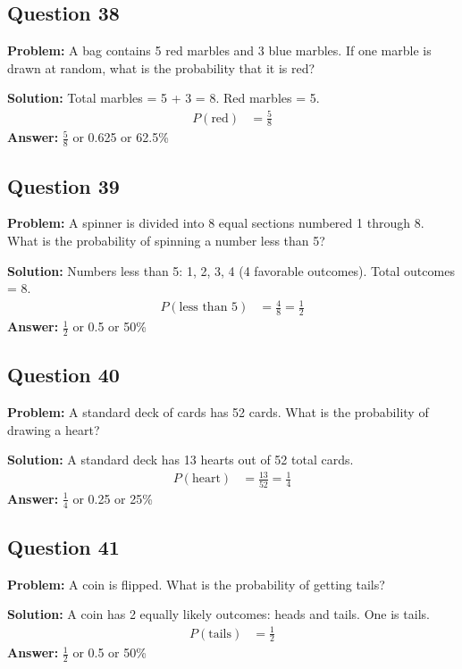 \documentclass[12pt]{article}
\begin{document}
\subsection*{Question 38}
\textbf{Problem:} A bag contains 5 red marbles and 3 blue marbles. If one marble is drawn at random, what is the probability that it is red?

\textbf{Solution:} Total marbles = 5 + 3 = 8. Red marbles = 5.
\begin{align*}
P(\text{red}) &= \frac{5}{8}
\end{align*}
\textbf{Answer:} $\frac{5}{8}$ or 0.625 or 62.5\%

\subsection*{Question 39}
\textbf{Problem:} A spinner is divided into 8 equal sections numbered 1 through 8. What is the probability of spinning a number less than 5?

\textbf{Solution:} Numbers less than 5: 1, 2, 3, 4 (4 favorable outcomes). Total outcomes = 8.
\begin{align*}
P(\text{less than 5}) &= \frac{4}{8} = \frac{1}{2}
\end{align*}
\textbf{Answer:} $\frac{1}{2}$ or 0.5 or 50\%

\subsection*{Question 40}
\textbf{Problem:} A standard deck of cards has 52 cards. What is the probability of drawing a heart?

\textbf{Solution:} A standard deck has 13 hearts out of 52 total cards.
\begin{align*}
P(\text{heart}) &= \frac{13}{52} = \frac{1}{4}
\end{align*}
\textbf{Answer:} $\frac{1}{4}$ or 0.25 or 25\%

\subsection*{Question 41}
\textbf{Problem:} A coin is flipped. What is the probability of getting tails?

\textbf{Solution:} A coin has 2 equally likely outcomes: heads and tails. One is tails.
\begin{align*}
P(\text{tails}) &= \frac{1}{2}
\end{align*}
\textbf{Answer:} $\frac{1}{2}$ or 0.5 or 50\%
\end{document}
